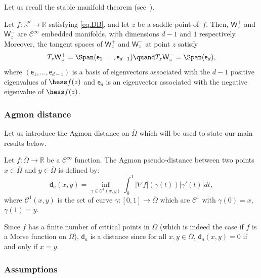 Let us recall the stable manifold theorem (see~\cite[Cor.\,6.4.1]{jost2008riemannian}).

\begin{theorem*}
Let $f: \mathbb R^d\to \mathbb R$ satisfying \eqref{eq.DB}, and let $z$
be a saddle point of~$f$. Then, $\mathsf W_z^+ $ and $\mathsf
W_z^- $ are $\mathcal C^\infty$ embedded manifolds, with
dimensions $d-1$ and $1$ respectively.
Moreover, the tangent spaces of $\mathsf W_z^+ $ and $\mathsf
W_z^- $ at point $z$ satisfy
\[
T_z\mathsf W_z^+ =\Span (\mathsf e_1\ldots,\mathsf e_{d-1})
\quand T_z \mathsf W_z^- = \Span(\mathsf e_d),
\]
where $(\mathsf e_1,\ldots,\mathsf e_{d-1})$ is a basis of eigenvectors associated with the $d-1$ positive eigenvalues of $\hess f(z)$ and $\mathsf e_d$ is an eigenvector associated with the negative eigenvalue of $\hess f(z)$.
\end{theorem*}

\subsubsection*{Agmon distance} Let us introduce the Agmon distance on $\overline \Omega$ which will be used to state our main results below.


\begin{definition} \label{de.da} Let $f:\overline \Omega\to \mathbb R$ be a $\mathcal C^\infty$ function.
The Agmon pseudo-distance between two points $x\in \overline \Omega$ and $y \in \overline \Omega$ is defined by:
\[
\mathsf d_a\left(x,y\right)=\inf _{\gamma\in \mathcal C^1(x,y)} \int_0^1\vert \nabla f\vert (\gamma(t)) \left\vert \gamma'(t) \right\vert dt,
\]
where $\mathcal C^1\left(x,y\right)$ is the set of curve $\gamma:[0,1] \to \overline \Omega$ which are $\mathcal C^1$ with $\gamma(0)=x$, $\gamma(1)=y$.
\end{definition}
Since $f$ has a finite number of critical points in
$\overline \Omega$ (which is indeed the case if $f$ is a Morse function on
$\overline \Omega$), $\mathsf d_a$ is a distance since for all $x,y\in
\overline \Omega$, $\mathsf d_a(x,y)=0$ if and only if $x=y$.

\subsubsection{Assumptions}

